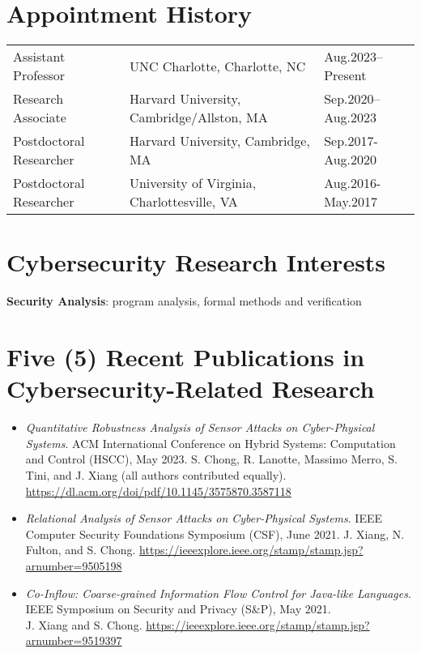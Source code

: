 \documentclass[12pt]{article}
\begin{document}
\section{Appointment History}

\begin{tabular}{p{5cm} p{7.5cm} R{4cm}}
    {Assistant Professor} & 
    UNC Charlotte, Charlotte, NC & Aug.2023–Present \\
    Research Associate &
    Harvard University, Cambridge/Allston, MA & Sep.2020–Aug.2023 \\
    Postdoctoral Researcher &
    Harvard University, Cambridge, MA & Sep.2017-Aug.2020 \\
    Postdoctoral Researcher &
    University of Virginia, Charlottesville, VA & Aug.2016-May.2017 \\
\end{tabular}

\section{Cybersecurity Research Interests}

\textbf{Security Analysis}: program analysis, formal methods and verification


\section{Five (5) Recent Publications in Cybersecurity-Related Research}

\begin{itemize}
\item \textit{Quantitative Robustness Analysis of Sensor Attacks on Cyber-Physical Systems}.
  ACM International Conference on Hybrid Systems: Computation and Control (HSCC), May 2023. 
  S. Chong, R. Lanotte, Massimo Merro, S. Tini, and J. Xiang
  (all authors contributed equally). {\url{https://dl.acm.org/doi/pdf/10.1145/3575870.3587118}}
\item \textit{Relational Analysis of Sensor Attacks on Cyber-Physical Systems}.
  IEEE Computer Security Foundations Symposium (CSF),  June 2021. {J. Xiang}, N. Fulton, and S. Chong. {\url{https://ieeexplore.ieee.org/stamp/stamp.jsp?arnumber=9505198}}
  
\item \textit{Co-Inflow: Coarse-grained Information Flow Control for Java-like Languages}.
  IEEE Symposium on Security and Privacy (S\&P), May 2021.  \\
  {J. Xiang} and S. Chong. {\url{https://ieeexplore.ieee.org/stamp/stamp.jsp?arnumber=9519397}}

\end{itemize}
\end{document}
